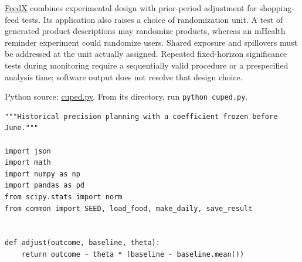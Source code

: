 \href{https://github.com/google-marketing-solutions/feedx}{FeedX}
combines experimental design with prior-period adjustment for
shopping-feed tests. Its application also raises a choice of
randomization unit. A test of generated product descriptions may
randomize products, whereas an mHealth reminder experiment could
randomize users. Shared exposure and spillovers must be addressed at the
unit actually assigned. Repeated fixed-horizon significance tests during
monitoring require a sequentially valid procedure or a prespecified
analysis time; software output does not resolve that design choice.

\FloatBarrier
{}
Python source:
\href{../03_Data_and_Code/mHealth/recurring_examples/cuped.py}{cuped.py}.
From its directory, run \texttt{python\ cuped.py}.

\begin{Verbatim}[breaklines,breakanywhere,fontsize=\small]
"""Historical precision planning with a coefficient frozen before June."""

import json
import math
import numpy as np
import pandas as pd
from scipy.stats import norm
from common import SEED, load_food, make_daily, save_result


def adjust(outcome, baseline, theta):
    return outcome - theta * (baseline - baseline.mean())



\end{Verbatim}

